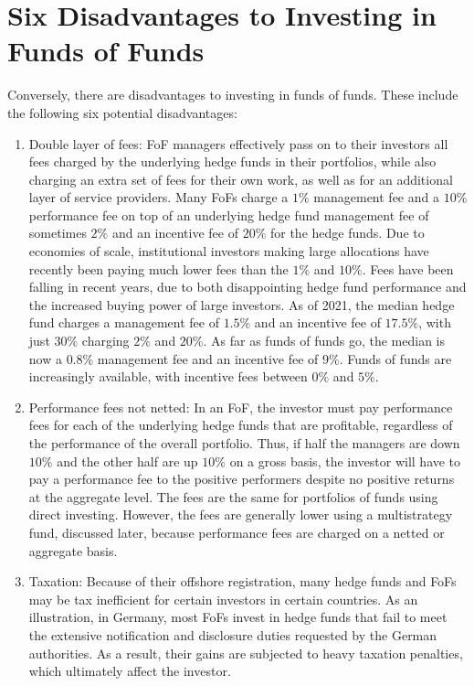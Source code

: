 \documentclass[11pt]{article}
\begin{document}
\section*{Six Disadvantages to Investing in Funds of Funds}
Conversely, there are disadvantages to investing in funds of funds. These include the following six potential disadvantages:

\begin{enumerate}
  \item Double layer of fees: FoF managers effectively pass on to their investors all fees charged by the underlying hedge funds in their portfolios, while also charging an extra set of fees for their own work, as well as for an additional layer of service providers. Many FoFs charge a $1 \%$ management fee and a $10 \%$ performance fee on top of an underlying hedge fund management fee of sometimes $2 \%$ and an incentive fee of $20 \%$ for the hedge funds. Due to economies of scale, institutional investors making large allocations have recently been paying much lower fees than the $1 \%$ and $10 \%$. Fees have been falling in recent years, due to both disappointing hedge fund performance and the increased buying power of large investors. As of 2021, the median hedge fund charges a management fee of $1.5 \%$ and an incentive fee of $17.5 \%$, with just $30 \%$ charging $2 \%$ and $20 \%$. As far as funds of funds go, the median is now a $0.8 \%$ management fee and an incentive fee of $9 \%$. Funds of funds are increasingly available, with incentive fees between $0 \%$ and $5 \%$.

  \item Performance fees not netted: In an FoF, the investor must pay performance fees for each of the underlying hedge funds that are profitable, regardless of the performance of the overall portfolio. Thus, if half the managers are down $10 \%$ and the other half are up $10 \%$ on a gross basis, the investor will have to pay a performance fee to the positive performers despite no positive returns at the aggregate level. The fees are the same for portfolios of funds using direct investing. However, the fees are generally lower using a multistrategy fund, discussed later, because performance fees are charged on a netted or aggregate basis.

  \item Taxation: Because of their offshore registration, many hedge funds and FoFs may be tax inefficient for certain investors in certain countries. As an illustration, in Germany, most FoFs invest in hedge funds that fail to meet the extensive notification and disclosure duties requested by the German authorities. As a result, their gains are subjected to heavy taxation penalties, which ultimately affect the investor.


\end{enumerate}
\end{document}
